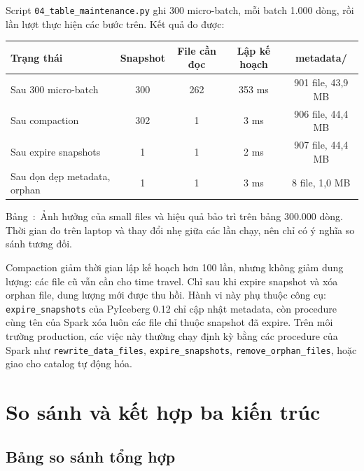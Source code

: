 \documentclass[12pt]{article}
\newenvironment{figblock}{\par\medskip\noindent\begin{minipage}{\linewidth}}{\end{minipage}\par\medskip}
\newcounter{bang}
\newcommand{\tabcap}[2]{%
  \begin{captionbelowboxaivn}\refstepcounter{bang}Bảng~\thebang:~#1\label{#2}\end{captionbelowboxaivn}}
\begin{document}
Script \texttt{04\_table\_maintenance.py} ghi 300 micro-batch, mỗi batch 1.000 dòng, rồi lần lượt thực hiện các bước trên. Kết quả đo được:

\begin{figblock}\begin{center}
\renewcommand{\arraystretch}{1.25}
\small
\begin{tabular}{|l|c|c|c|c|}
\hline
\rowcolor{rowLavender}
\textbf{Trạng thái} & \textbf{Snapshot} & \textbf{File cần đọc} & \textbf{Lập kế hoạch} & \textbf{metadata/} \\
\hline
Sau 300 micro-batch & 300 & 262 & 353 ms & 901 file, 43,9 MB \\
\hline
Sau compaction & 302 & 1 & 3 ms & 906 file, 44,4 MB \\
\hline
Sau expire snapshots & 1 & 1 & 2 ms & 907 file, 44,4 MB \\
\hline
Sau dọn dẹp metadata, orphan & 1 & 1 & 3 ms & 8 file, 1,0 MB \\
\hline
\end{tabular}
\end{center}
\tabcap{Ảnh hưởng của small files và hiệu quả bảo trì trên bảng 300.000 dòng. Thời gian đo trên laptop và thay đổi nhẹ giữa các lần chạy, nên chỉ có ý nghĩa so sánh tương đối.}{tab:maint}
\end{figblock}

Compaction giảm thời gian lập kế hoạch hơn 100 lần, nhưng không giảm dung lượng: các file cũ vẫn cần cho time travel. Chỉ sau khi expire snapshot và xóa orphan file, dung lượng mới được thu hồi. Hành vi này phụ thuộc công cụ: \texttt{expire\_snapshots} của PyIceberg 0.12 chỉ cập nhật metadata, còn procedure cùng tên của Spark xóa luôn các file chỉ thuộc snapshot đã expire. Trên môi trường production, các việc này thường chạy định kỳ bằng các procedure của Spark như \texttt{rewrite\_data\_files}, \texttt{expire\_snapshots}, \texttt{remove\_orphan\_files}, hoặc giao cho catalog tự động hóa.

\section{So sánh và kết hợp ba kiến trúc}
\label{sec:hybrid}

\subsection{Bảng so sánh tổng hợp}
\end{document}
